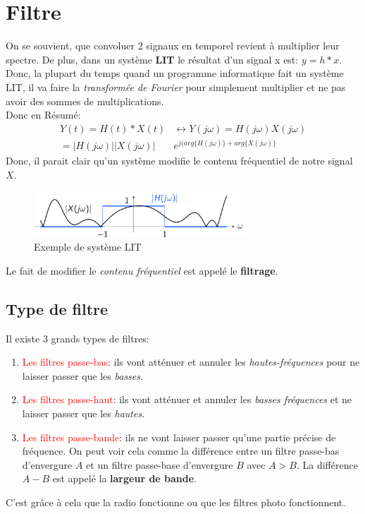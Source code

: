 \documentclass{report}
\begin{document}
\section{Filtre}
On se souvient, que convoluer 2 signaux en temporel revient à multiplier leur spectre. De plus, dans un système \textbf{LIT} le résultat d'un signal x est: $y = h\ast x$. Donc, la plupart du temps quand un programme informatique fait un système LIT, il va faire la \textit{transformée de Fourier} pour simplement multiplier et ne pas avoir des sommes de multiplications.\\
Donc en Résumé:
\begin{align*}
Y(t) = H(t) \ast X(t) &\longleftrightarrow Y(j\omega) = H(j \omega) X(j \omega)\\
=|H(j \omega)||X(j \omega)|&e^{j(arg\{H(j\omega )\}+ arg\{X(j \omega) \}}
\end{align*}
Donc, il parait clair qu'un système modifie le contenu fréquentiel de notre signal $X$.
\begin{figure}[H]
\centering
\includegraphics[width=8cm]{img/signalFreq.png}
\caption{Exemple de système LIT}
\end{figure}
Le fait de modifier le \textit{contenu fréquentiel} est appelé le \textbf{filtrage}.
\subsection{Type de filtre}
Il existe 3 grands types de filtres:
\begin{enumerate}
\item \textcolor{red}{Les filtres passe-bas}: ils vont atténuer et annuler les \textit{hautes-fréquences} pour ne laisser passer que les \textit{basses}.
\item \textcolor{red}{Les filtres passe-haut}: ils vont atténuer et annuler les \textit{basses fréquences} et ne laisser passer que les \textit{hautes}.
\item \textcolor{red}{Les filtres passe-bande}: ils ne vont laisser passer qu'une partie précise de fréquence. On peut voir cela comme la différence entre un filtre passe-bas d'envergure $A$ et un filtre passe-base d'envergure $B$ avec $A>B$. La différence $A-B$ est appelé la \textbf{largeur de bande}. 
\end{enumerate}
C'est grâce à cela que la radio fonctionne ou que les filtres photo fonctionnent.\\
\end{document}
